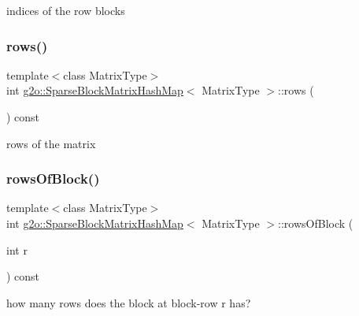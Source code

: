 indices of the row blocks 

\mbox{\label{classg2o_1_1_sparse_block_matrix_hash_map_ae2749be9e20ee0f2ca85df29b74ecb25}} 
\subsubsection{\texorpdfstring{rows()}{rows()}}
{\footnotesize\ttfamily template$<$class Matrix\+Type$>$ \\
int \mbox{\hyperlink{classg2o_1_1_sparse_block_matrix_hash_map}{g2o\+::\+Sparse\+Block\+Matrix\+Hash\+Map}}$<$ Matrix\+Type $>$\+::rows (\begin{DoxyParamCaption}{ }\end{DoxyParamCaption}) const\hspace{0.3cm}{\ttfamily [inline]}}



rows of the matrix 

\mbox{\label{classg2o_1_1_sparse_block_matrix_hash_map_afd5e53b51549fbe1c71d96f986120b65}} 
\subsubsection{\texorpdfstring{rows\+Of\+Block()}{rowsOfBlock()}}
{\footnotesize\ttfamily template$<$class Matrix\+Type$>$ \\
int \mbox{\hyperlink{classg2o_1_1_sparse_block_matrix_hash_map}{g2o\+::\+Sparse\+Block\+Matrix\+Hash\+Map}}$<$ Matrix\+Type $>$\+::rows\+Of\+Block (\begin{DoxyParamCaption}\item[{int}]{r }\end{DoxyParamCaption}) const\hspace{0.3cm}{\ttfamily [inline]}}



how many rows does the block at block-\/row r has? 



